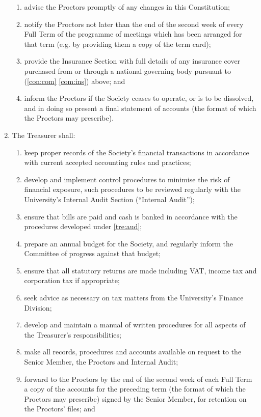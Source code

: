 \documentclass[11pt]{article}
\begin{document}
\begin{enumerate}
\begin{enumerate}
\item advise the Proctors promptly of any changes in this Constitution;
\item notify the Proctors not later than the end of the second week of every Full Term of the programme of meetings which has been arranged for that term (e.g. by providing them a copy of the term card); 
\item provide the Insurance Section with full details of any insurance cover purchased from or through a national governing body pursuant to  (\cref{con:com} \cref{com:ins}) above; and
\item inform the Proctors if the Society ceases to operate, or is to be dissolved, and in doing so present a final statement of accounts (the format of which the Proctors may prescribe).
\end{enumerate}
\item \label{com:tre} The Treasurer shall:
\begin{enumerate}
\item \label{tre:rec} keep proper records of the Society's financial transactions in accordance with current accepted accounting rules and practices;
\item \label{tre:aud} develop and implement control procedures to minimise the risk of financial exposure, such procedures to be reviewed regularly with the University's Internal Audit Section (``Internal Audit'');
\item ensure that bills are paid and cash is banked in accordance with the procedures developed under \cref{tre:aud};
\item prepare an annual budget for the Society, and regularly inform the Committee of progress against that budget;
\item ensure that all statutory returns are made including VAT, income tax and corporation tax if appropriate;
\item seek advice as necessary on tax matters from the University's Finance Division;
\item develop and maintain a manual of written procedures for all aspects of the Treasurer's responsibilities;
\item make all records, procedures and accounts available on request to the Senior Member, the Proctors and Internal Audit;
\item forward to the Proctors by the end of the second week of each Full Term a copy of the accounts for the preceding term (the format of which the Proctors may prescribe) signed by the Senior Member, for retention on the Proctors' files; and

\end{enumerate}
\end{enumerate}
\end{document}
